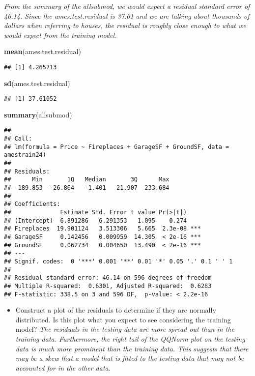\documentclass[
]{article}
\newenvironment{Shaded}{\begin{snugshade}}{\end{snugshade}}
\newcommand{\KeywordTok}[1]{\textcolor[rgb]{0.13,0.29,0.53}{\textbf{#1}}}
\newcommand{\NormalTok}[1]{#1}
\providecommand{\tightlist}{%
  \setlength{\itemsep}{0pt}\setlength{\parskip}{0pt}}
\begin{document}
\emph{From the summary of the allsubmod, we would expect a residual
standard error of 46.14. Since the ames.test.residual is 37.61 and we
are talking about thousands of dollars when referring to houses, the
residual is roughly close enough to what we would expect from the
training model.}

\begin{Shaded}
\begin{Highlighting}[]
\KeywordTok{mean}\NormalTok{(ames.test.residual)}
\end{Highlighting}
\end{Shaded}

\begin{verbatim}
## [1] 4.265713
\end{verbatim}

\begin{Shaded}
\begin{Highlighting}[]
\KeywordTok{sd}\NormalTok{(ames.test.residual)}
\end{Highlighting}
\end{Shaded}

\begin{verbatim}
## [1] 37.61052
\end{verbatim}

\begin{Shaded}
\begin{Highlighting}[]
\KeywordTok{summary}\NormalTok{(allsubmod)}
\end{Highlighting}
\end{Shaded}

\begin{verbatim}
## 
## Call:
## lm(formula = Price ~ Fireplaces + GarageSF + GroundSF, data = amestrain24)
## 
## Residuals:
##      Min       1Q   Median       3Q      Max 
## -189.853  -26.864   -1.401   21.907  233.684 
## 
## Coefficients:
##              Estimate Std. Error t value Pr(>|t|)    
## (Intercept)  6.891286   6.291353   1.095    0.274    
## Fireplaces  19.901124   3.513306   5.665  2.3e-08 ***
## GarageSF     0.142456   0.009959  14.305  < 2e-16 ***
## GroundSF     0.062734   0.004650  13.490  < 2e-16 ***
## ---
## Signif. codes:  0 '***' 0.001 '**' 0.01 '*' 0.05 '.' 0.1 ' ' 1
## 
## Residual standard error: 46.14 on 596 degrees of freedom
## Multiple R-squared:  0.6301, Adjusted R-squared:  0.6283 
## F-statistic: 338.5 on 3 and 596 DF,  p-value: < 2.2e-16
\end{verbatim}

\begin{itemize}
\tightlist
\item
  Construct a plot of the residuals to determine if they are normally
  distributed. Is this plot what you expect to see considering the
  training model? \emph{The residuals in the testing data are more
  spread out than in the training data. Furthermore, the right tail of
  the QQNorm plot on the testing data is much more prominent than the
  training data. This suggests that there may be a skew that a model
  that is fitted to the testing data that may not be accounted for in
  the other data.}
\end{itemize}
\end{document}
